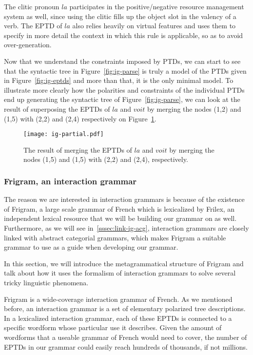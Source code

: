 The clitic pronoun $la$ participates in the positive/negative resource
management system as well, since using the clitic fills up the object
slot in the valency of a verb. The EPTD of $la$ also relies heavily on
virtual features and uses them to specify in more detail the context in
which this rule is applicable, so as to avoid over-generation.

Now that we understand the constraints imposed by PTDs, we can start to
see that the syntactic tree in Figure~\ref{fig:ig-parse} is truly a
model of the PTDs given in Figure~\ref{fig:ig-eptds} and more than that,
it is the only minimal model. To illustrate more clearly how the
polarities and constraints of the individual PTDs end up generating the
syntactic tree of Figure~\ref{fig:ig-parse}, we can look at the result
of superposing the EPTDs of $la$ and $voit$ by merging the nodes (1,2)
and (1,5) with (2,2) and (2,4) respectively on
Figure~\ref{fig:ig-partial}.

\begin{figure}
  \centering
  \texttt{[image: ig-partial.pdf]}
  \caption{\label{fig:ig-partial} The result of merging the EPTDs of
    $la$ and $voit$ by merging the nodes (1,5) and (1,5) with (2,2) and
    (2,4), respectively.}
\end{figure}

\subsubsection{Frigram, an interaction grammar}

The reason we are interested in interaction grammars is because of the
existence of Frigram, a large scale grammar of French which is
lexicalized by Frilex, an independent lexical resource that we will be
building our grammar on as well. Furthermore, as we will see
in~\ref{sssec:link-ig-acg}, interaction grammars are closely linked with
abstract categorial grammars, which makes Frigram a suitable grammar to
use as a guide when developing our grammar.

In this section, we will introduce the metagrammatical structure of
Frigram and talk about how it uses the formalism of interaction grammars
to solve several tricky linguistic phenomena.

Frigram is a wide-coverage interaction grammar of French. As we
mentioned before, an interaction grammar is a set of elementary
polarized tree descriptions. In a lexicalized interaction grammar, each
of these EPTDs is connected to a specific wordform whose particular use
it describes. Given the amount of wordforms that a useable grammar of
French would need to cover, the number of EPTDs in our grammar could
easily reach hundreds of thousands, if not millions.

